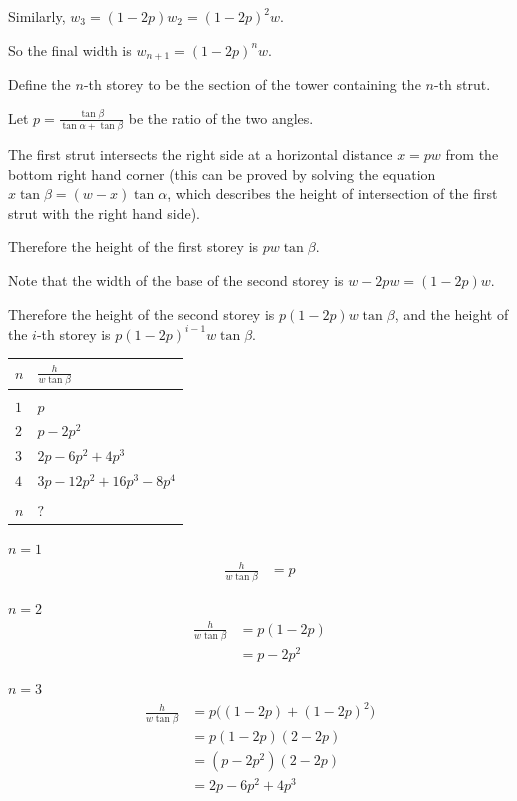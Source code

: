 \documentclass[12pt]{article}
\begin{document}
Similarly, $w_3 = (1 - 2p)w_2 = (1 - 2p)^2w$.

So the final width is $w_{n+1} = (1 - 2p)^nw$.


Define the $n$-th storey to be the section of the tower containing the $n$-th strut.

Let $p = \frac{\tan\beta}{\tan\alpha + \tan\beta}$ be the ratio of the two angles.

The first strut intersects the right side at a horizontal distance $x = pw$ from the bottom right
hand corner (this can be proved by solving the equation $x\tan\beta = (w - x)\tan\alpha$, which
describes the height of intersection of the first strut with the right hand side).

Therefore the height of the first storey is $pw\tan\beta$.

Note that the width of the base of the second storey is $w - 2pw = (1 - 2p)w$.

Therefore the height of the second storey is $p(1 - 2p)w\tan\beta$, and the height of the $i$-th
storey is $p(1 - 2p)^{i-1}w\tan\beta$.

\newpage

\begin{tabular}{l|l}
  $n$&$\frac{h}{w\tan\beta}$\\
  \hline\\
  $1$& $p$\\
  $2$& $p - 2p^2$\\
  $3$& $2p - 6p^2 + 4p^3$\\
  $4$& $3p - 12p^2 + 16p^3 - 8p^4$\\ \\
  $n$& $?$
\end{tabular}


$n = 1$
\begin{align*}
  \frac{h}{w\tan\beta}
  &= p
\end{align*}

$n = 2$
\begin{align*}
  \frac{h}{w\tan\beta}
  &= p(1 - 2p)\\
        &= p - 2p^2
\end{align*}

$n = 3$
\begin{align*}
  \frac{h}{w\tan\beta}
  &= p\Big((1 - 2p) + (1 - 2p)^2\Big)\\
  &= p(1 - 2p)(2 - 2p)\\
  &= (p - 2p^2)(2 - 2p)\\
  &= 2p - 6p^2 + 4p^3
\end{align*}
\end{document}
